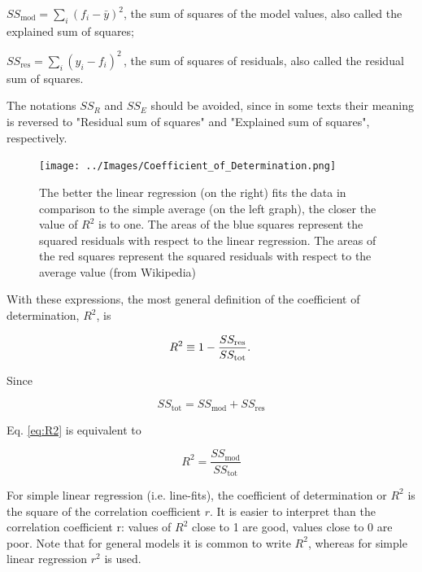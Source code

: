     $SS_\text{mod}=\sum_i (f_i -\bar{y})^2$, the sum of squares of the model values, also called the explained sum of squares;

    $SS_\text{res}=\sum_i (y_i - f_i)^2\,$, the sum of squares of residuals, also called the residual sum of squares.

\vspace{5 mm}

The notations $SS_{R}$ and $SS_{E}$ should be avoided, since in some texts their meaning is reversed to "Residual sum of squares" and "Explained sum of squares", respectively.

\begin{figure}
  \centering
  \texttt{[image: ../Images/Coefficient\_of\_Determination.png]}\\
  \caption{The better the linear regression (on the right) fits the data in comparison to the simple average (on the left graph), the closer the value of $R^2$ is to one. The areas of the blue squares represent the squared residuals with respect to the linear regression. The areas of the red squares represent the squared residuals with respect to the average value (from Wikipedia)}\label{fig:CoefDetermination}
\end{figure}

\vspace{5 mm}

With these expressions, the most general definition of the coefficient of determination, $R^2$, is

\begin{equation}\label{eq:R2}
  R^2 \equiv 1 - {SS_{\rm res}\over SS_{\rm tot}}.\,
\end{equation}

Since

\begin{equation}
  SS_\text{tot} = SS_\text{mod} + SS_\text{res}
\end{equation}

Eq. \ref{eq:R2} is equivalent to

\begin{equation}
  R^2 = \frac{SS_\text{mod}}{SS_\text{tot}}
\end{equation}

For simple linear regression (i.e. line-fits), the coefficient of determination or $R^2$ is the square of the correlation coefficient $r$. It is easier to interpret than the correlation coefficient r: values of $R^2$ close to 1 are good, values close to 0 are poor.
Note that for general models it is common to write $R^2$, whereas for simple linear regression $r^2$ is used.

